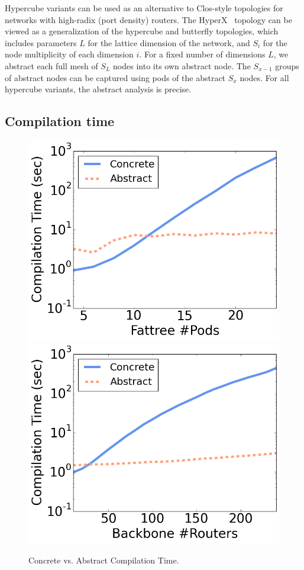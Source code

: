 \documentclass[numbers, 10pt, preprint]{sigplanconf}
\newcommand{\para}[1]{\paragraph*{\textbf{#1}}}
\begin{document}
Hypercube variants can be used as an alternative to Clos-style topologies for networks with high-radix (port density) routers. The HyperX~\cite{hyperx} topology can be viewed as a generalization of the hypercube and butterfly topologies, which includes parameters $L$ for the lattice dimension of the network, and $S_i$ for the node multiplicity of each dimension $i$.
For a fixed number of dimensions $L$, we abstract each full mesh of $S_L$ nodes into its own abstract node. The $S_{x-1}$ groups of abstract nodes can be captured using pods of the abstract $S_x$ nodes. For all hypercube variants, the abstract analysis is precise.

%


\subsection{Compilation time}

\begin{figure}[t!]
    {\includegraphics[width=.49\columnwidth]{figures/Fattree-time.png}}
    {\includegraphics[width=.49\columnwidth]{figures/backbone-time.png}} \\
  \caption{Concrete vs. Abstract Compilation Time. \label{fig:compilation-times}}
  \vspace{-1em}
\end{figure}
\end{document}
